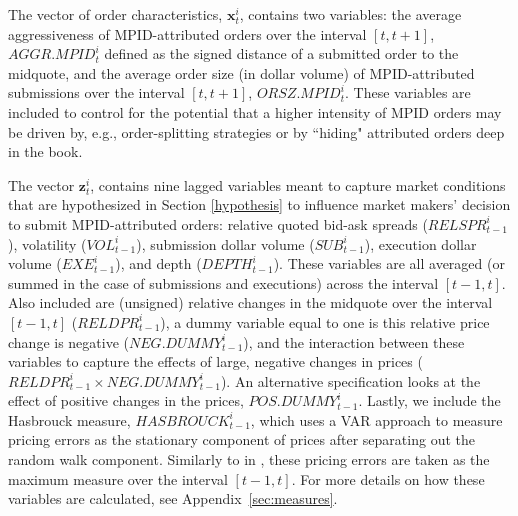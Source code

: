 \documentclass{article}
\begin{document}
The vector of order characteristics, $\textbf{x}_t^i$, contains two variables: the average aggressiveness of MPID-attributed orders over the interval $[t,t+1]$, $AGGR.MPID_t^i$ defined as the signed distance of a submitted order to the midquote, and the average order size (in dollar volume) of MPID-attributed submissions over the interval $[t,t+1]$, $ORSZ.MPID_t^i$. These variables are included to control for the potential that a higher intensity of MPID orders may be driven by, e.g., order-splitting strategies or by ``hiding" attributed orders deep in the book.

The vector $\textbf{z}_t^i$, contains nine lagged variables meant to capture market conditions that are hypothesized in Section \ref{hypothesis} to influence market makers' decision to submit MPID-attributed orders: relative quoted bid-ask spreads ($RELSPR_{t-1}^i$), volatility ($VOL_{t-1}^i$), submission dollar volume ($SUB_{t-1}^i$), execution dollar volume ($EXE_{t-1}^i$), and depth ($DEPTH_{t-1}^i$). These variables are all averaged (or summed in the case of submissions and executions) across the interval $[t-1,t]$. Also included are (unsigned) relative changes in the midquote over the interval $[t-1,t]$ ($RELDPR_{t-1}^i$), a dummy variable equal to one is this relative price change is negative ($NEG.DUMMY_{t-1}^i$), and the interaction between these variables to capture the effects of large, negative changes in prices ($RELDPR_{t-1}^i \times NEG.DUMMY_{t-1}^i$). An alternative specification looks at the effect of positive changes in the prices, $POS.DUMMY_{t-1}^i$. Lastly, we include the Hasbrouck measure, $HASBROUCK_{t-1}^i$, which uses a VAR approach to measure pricing errors as the stationary component of prices after separating out the random walk component. Similarly to in \citet{rosch2017dynamics}, these pricing errors are taken as the maximum measure over the interval $[t-1,t]$. For more details on how these variables are calculated, see Appendix~\ref{sec:measures}.
\end{document}
